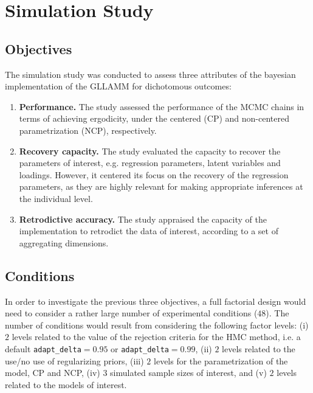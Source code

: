 \chapter{Simulation Study} \label{chap:simulation}

\section{Objectives} \label{sec:objectives}

The simulation study was conducted to assess three attributes of the bayesian implementation of the GLLAMM for dichotomous outcomes:
%
\begin{enumerate}
	\item \textbf{Performance.} The study assessed the performance of the MCMC chains in terms of achieving ergodicity, under the centered (CP) and non-centered parametrization (NCP), respectively.
	\item \textbf{Recovery capacity.} The study evaluated the capacity to recover the parameters of interest, e.g. regression parameters, latent variables and loadings. However, it centered its focus on the recovery of the regression parameters, as they are highly relevant for making appropriate inferences at the individual level.
	\item \textbf{Retrodictive accuracy.} The study appraised the capacity of the implementation to retrodict the data of interest, according to a set of aggregating dimensions.
\end{enumerate} 


\section{Conditions} \label{sec:conditions}

In order to investigate the previous three objectives, a full factorial design would need to consider a rather large number of experimental conditions ($48$). The number of conditions would result from considering the following factor levels: (i) $2$ levels related to the value of the rejection criteria for the HMC method, i.e. a default \texttt{adapt\_delta}$=0.95$ or \texttt{adapt\_delta}$=0.99$, (ii) $2$ levels related to the use/no use of regularizing priors, (iii) $2$ levels for the parametrization of the model, CP and NCP, (iv) $3$ simulated sample sizes of interest, and (v) $2$ levels related to the models of interest.


